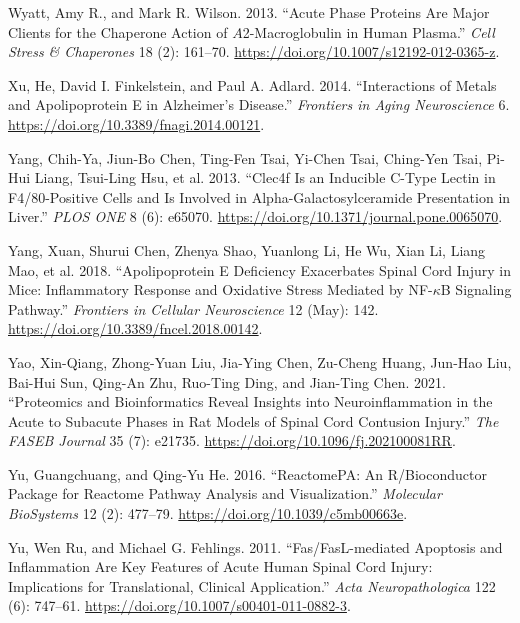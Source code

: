 \documentclass[9pt,lineno]{elife}
\newlength{\cslhangindent}
\newlength{\cslentryspacingunit} %
\newenvironment{CSLReferences}[2] %
 {%
  \setlength{\parindent}{0pt}
  \ifodd #1
  \let\oldpar\par
  \def\par{\hangindent=\cslhangindent\oldpar}
  \fi
  \setlength{\parskip}{#2\cslentryspacingunit}
 }%
 {}
\begin{document}
\begin{landscape}
\begin{landscape}
\begin{landscape}
\begin{landscape}
\begin{CSLReferences}{1}{0}
\leavevmode{}%
Wyatt, Amy R., and Mark R. Wilson. 2013. {``Acute Phase Proteins Are Major Clients for the Chaperone Action of {\(A\)}2-Macroglobulin in Human Plasma.''} \emph{Cell Stress \& Chaperones} 18 (2): 161--70. \url{https://doi.org/10.1007/s12192-012-0365-z}.

\leavevmode{}%
Xu, He, David I. Finkelstein, and Paul A. Adlard. 2014. {``Interactions of Metals and {Apolipoprotein E} in {Alzheimer}'s Disease.''} \emph{Frontiers in Aging Neuroscience} 6. \url{https://doi.org/10.3389/fnagi.2014.00121}.

\leavevmode{}%
Yang, Chih-Ya, Jiun-Bo Chen, Ting-Fen Tsai, Yi-Chen Tsai, Ching-Yen Tsai, Pi-Hui Liang, Tsui-Ling Hsu, et al. 2013. {``{Clec4f Is} an {Inducible C-Type Lectin} in {F4}/80-{Positive Cells} and {Is Involved} in {Alpha-Galactosylceramide Presentation} in {Liver}.''} \emph{PLOS ONE} 8 (6): e65070. \url{https://doi.org/10.1371/journal.pone.0065070}.

\leavevmode{}%
Yang, Xuan, Shurui Chen, Zhenya Shao, Yuanlong Li, He Wu, Xian Li, Liang Mao, et al. 2018. {``Apolipoprotein {E Deficiency Exacerbates Spinal Cord Injury} in {Mice}: {Inflammatory Response} and {Oxidative Stress Mediated} by {NF-\(\kappa\)B Signaling Pathway}.''} \emph{Frontiers in Cellular Neuroscience} 12 (May): 142. \url{https://doi.org/10.3389/fncel.2018.00142}.

\leavevmode{}%
Yao, Xin-Qiang, Zhong-Yuan Liu, Jia-Ying Chen, Zu-Cheng Huang, Jun-Hao Liu, Bai-Hui Sun, Qing-An Zhu, Ruo-Ting Ding, and Jian-Ting Chen. 2021. {``Proteomics and Bioinformatics Reveal Insights into Neuroinflammation in the Acute to Subacute Phases in Rat Models of Spinal Cord Contusion Injury.''} \emph{The FASEB Journal} 35 (7): e21735. \url{https://doi.org/10.1096/fj.202100081RR}.

\leavevmode{}%
Yu, Guangchuang, and Qing-Yu He. 2016. {``{ReactomePA}: An {R}/{Bioconductor} Package for Reactome Pathway Analysis and Visualization.''} \emph{Molecular BioSystems} 12 (2): 477--79. \url{https://doi.org/10.1039/c5mb00663e}.

\leavevmode{}%
Yu, Wen Ru, and Michael G. Fehlings. 2011. {``Fas/{FasL-mediated} Apoptosis and Inflammation Are Key Features of Acute Human Spinal Cord Injury: Implications for Translational, Clinical Application.''} \emph{Acta Neuropathologica} 122 (6): 747--61. \url{https://doi.org/10.1007/s00401-011-0882-3}.


\end{CSLReferences}
\end{landscape}
\end{landscape}
\end{landscape}
\end{landscape}
\end{document}
